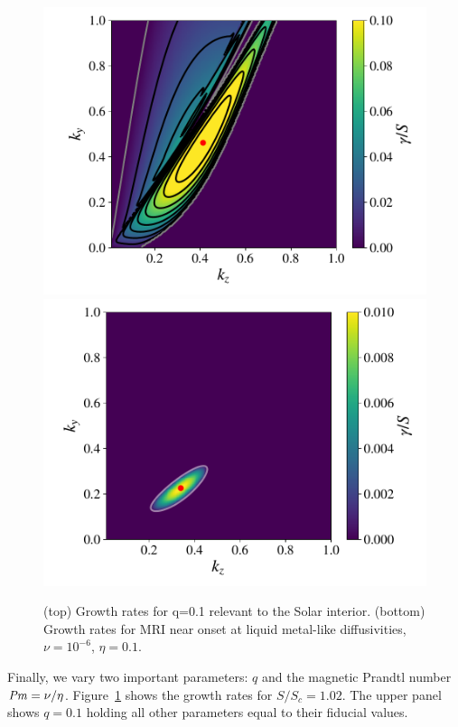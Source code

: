 \documentclass[aps,prl,reprint,superscriptaddress]{revtex4-1}
\newcommand{\SSC}{S/S_{c}}
\newcommand{\Prm}{\mbox{\textit{Pm}}}
\begin{document}
\begin{figure}[h!]
  \centering
  \includegraphics[width=\columnwidth]{run_47_output_growthrates.pdf}\\
  \includegraphics[width=\columnwidth]{run_49_output_growthrates.pdf}
  \caption{(top) Growth rates for q=0.1 relevant to the Solar interior. (bottom) Growth rates for MRI near onset at liquid metal-like diffusivities, $\nu=10^{-6}$, $\eta = 0.1$.}
  \label{fig:other_params}
\end{figure}
Finally, we vary two important parameters:
$q$ and the magnetic Prandtl number $\Prm = \nu/\eta$.
Figure~\ref{fig:other_params} shows the growth rates for $\SSC = 1.02$.
The upper panel shows $q = 0.1$ holding all other parameters equal to their fiducial values.
\end{document}
